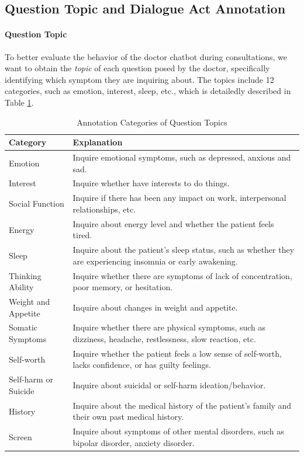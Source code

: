 \subsection{Question Topic and Dialogue Act Annotation}
\label{apd:annotation}
\paragraph{Question Topic}
To better evaluate the behavior of the doctor chatbot during consultations, we want to obtain the \textit{topic} of each question posed by the doctor, specifically identifying which symptom they are inquiring about. The topics include 12 categories, such as emotion, interest, sleep, etc., which is detailedly described in Table \ref{tab:annotation}. 
\begin{table}[th]
    \footnotesize
    \centering
    \begin{tabular}{ m{2.6cm} | m{4.3cm} }
    \hline
    Category & Explanation \\
    \hline
    Emotion & Inquire emotional symptoms, such as depressed, anxious and sad.\\
    \hline
    Interest & Inquire whether have interests to do things. \\
    \hline
    Social Function & Inquire if there has been any impact on work, interpersonal relationships, etc. \\
    \hline
    Energy & Inquire about energy level and whether the patient feels tired.\\
    \hline
    Sleep & Inquire about the patient's sleep status, such as whether they are experiencing insomnia or early awakening.\\
    \hline
    Thinking Ability & Inquire whether there are symptoms of lack of concentration, poor memory, or hesitation.\\
    \hline
    Weight and Appetite & Inquire about changes in weight and appetite. \\
    \hline
    Somatic Symptoms &  Inquire whether there are physical symptoms, such as dizziness, headache, restlessness, slow reaction, etc.\\
   \hline 
    Self-worth & Inquire whether the patient feels a low sense of self-worth, lacks confidence, or has guilty feelings. \\
    \hline
    Self-harm or Suicide & Inquire about suicidal or self-harm ideation/behavior.\\
    \hline
    History & Inquire about the medical history of the patient's family and their own past medical history. \\
    \hline
    Screen & Inquire about symptoms of other mental disorders, such as bipolar disorder, anxiety disorder.\\
    \hline
    \end{tabular}
    \caption{Annotation Categories of Question Topics}
    \label{tab:annotation}
\end{table}
 

